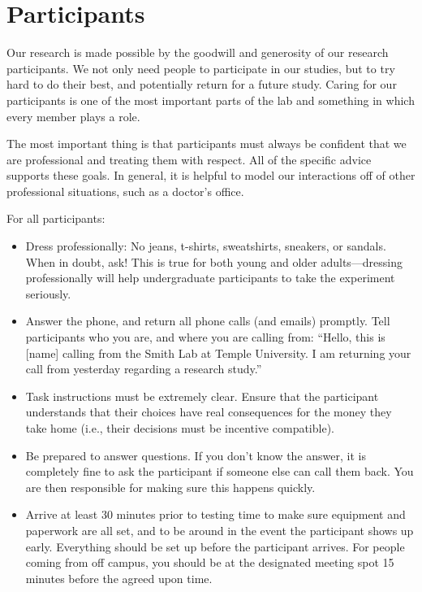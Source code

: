 \documentclass[letterpaper,12pt,oneside]{memoir}
\begin{document}
\section{Participants}
\label{sec:participants}

Our research is made possible by the goodwill and generosity of our research participants. We not only need people to participate in our studies, but to try hard to do their best, and potentially return for a future study. Caring for our participants is one of the most important parts of the lab and something in which every member plays a role.

The most important thing is that participants must always be confident that we are professional and treating them with respect. All of the specific advice supports these goals. In general, it is helpful to model our interactions off of other professional situations, such as a doctor's office.

For all participants:

\begin{itemize}
\item Dress professionally: No jeans, t-shirts, sweatshirts, sneakers, or sandals. When in doubt, ask! This is true for both young and older adults---dressing professionally will help undergraduate participants to take the experiment seriously.
\item Answer the phone, and return all phone calls (and emails) promptly. Tell participants who you are, and where you are calling from: ``Hello, this is [name] calling from the Smith Lab at Temple University. I am returning your call from yesterday regarding a research study.''
\item Task instructions must be extremely clear. Ensure that the participant understands that their choices have real consequences for the money they take home (i.e., their decisions must be incentive compatible). 
\item Be prepared to answer questions. If you don't know the answer, it is completely fine to ask the participant if someone else can call them back. You are then responsible for making sure this happens quickly.
\item Arrive at least 30 minutes prior to testing time to make sure equipment and paperwork are all set, and to be around in the event the participant shows up early. Everything should be set up before the participant arrives. For people coming from off campus, you should be at the designated meeting spot 15 minutes before the agreed upon time.
\end{itemize}
	
\end{document}
